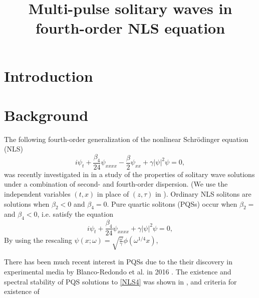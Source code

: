 \documentclass[12pt]{article}
\title{Multi-pulse solitary waves in fourth-order NLS equation}
\begin{document}
\maketitle






\section{Introduction}

\section{Background}

The following fourth-order generalization of the nonlinear Schr{\"o}dinger equation (NLS)
\begin{equation}\label{NLS4}
i \psi_t + \frac{\beta_4}{24}\psi_{xxxx} - \frac{\beta}{2}\psi_{xx} + \gamma |\psi|^2 \psi = 0,
\end{equation}
was recently investigated in \cite{Tam2020} in a study of the properties of solitary wave solutions under a combination of second- and fourth-order dispersion. (We use the independent variables $(t, x)$ in place of $(z, \tau)$ in \cite{Tam2020}). Ordinary NLS solitons are solutions when $\beta_2 < 0$ and $\beta_4 = 0$. Pure quartic solitons (PQSs) occur when $\beta_2 = $ and $\beta_4 < 0$, i.e. satisfy the equation
\begin{equation}\label{PQSeq}
i \psi_t + \frac{\beta_4}{24}\psi_{xxxx} + \gamma |\psi|^2 \psi = 0,
\end{equation}
By using the rescaling $\psi(x; \omega) = \sqrt{\frac{\omega}{\gamma}}\phi(\omega^{1/4}x)$, 

There has been much recent interest in PQSs due to the their discovery in experimental media by Blanco-Redondo et al. in 2016 \cite{BlancoPQS}. The existence and spectral stability of PQS solutions to \cref{NLS4} was shown in \cite{Tam2019}, and criteria for existence of 
\end{document}
